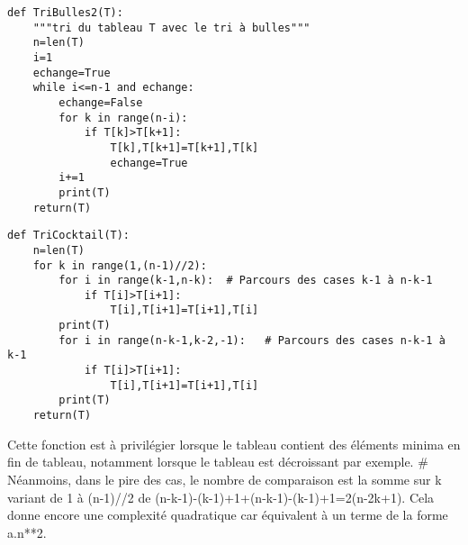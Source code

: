 \begin{lstlisting}
def TriBulles2(T):
    """tri du tableau T avec le tri à bulles"""
    n=len(T)
    i=1
    echange=True
    while i<=n-1 and echange:
        echange=False
        for k in range(n-i):
            if T[k]>T[k+1]:
                T[k],T[k+1]=T[k+1],T[k]
                echange=True
        i+=1
        print(T)
    return(T)
\end{lstlisting}




\begin{lstlisting}
def TriCocktail(T):
    n=len(T)
    for k in range(1,(n-1)//2):
        for i in range(k-1,n-k):  # Parcours des cases k-1 à n-k-1
            if T[i]>T[i+1]:
                T[i],T[i+1]=T[i+1],T[i]
        print(T)
        for i in range(n-k-1,k-2,-1):   # Parcours des cases n-k-1 à k-1
            if T[i]>T[i+1]:
                T[i],T[i+1]=T[i+1],T[i]
        print(T)
    return(T)
\end{lstlisting}



Cette fonction est à privilégier lorsque le tableau contient des éléments minima en fin de tableau, notamment lorsque le tableau est décroissant par exemple.
# Néanmoins, dans le pire des cas, le nombre de comparaison est la somme sur k variant de 1 à (n-1)//2 de (n-k-1)-(k-1)+1+(n-k-1)-(k-1)+1=2(n-2k+1). Cela donne encore une complexité quadratique car équivalent à un terme de la forme a.n**2.

